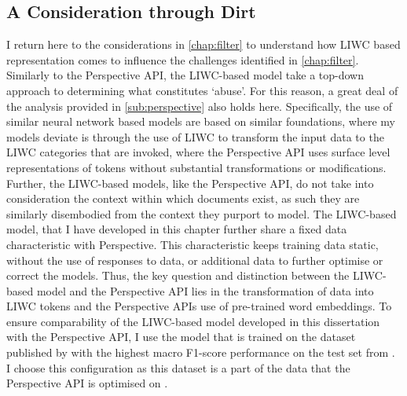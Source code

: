 
\subsection{A Consideration through Dirt}\label{sub:liwc_model}

I return here to the considerations in \cref{chap:filter} to understand how LIWC based representation comes to influence the challenges identified in \cref{chap:filter}.
Similarly to the Perspective API, the LIWC-based model take a top-down approach to determining what constitutes `abuse'. For this reason, a great deal of the analysis provided in \cref{sub:perspective} also holds here.
Specifically, the use of similar neural network based models are based on similar foundations, where my models deviate is through the use of LIWC \cite{Pennebaker:2001} to transform the input data to the LIWC categories that are invoked, where the Perspective API uses surface level representations of tokens without substantial transformations or modifications. 
Further, the LIWC-based models, like the Perspective API, do not take into consideration the context within which documents exist, as such they are similarly disembodied from the context they purport to model.
The LIWC-based model, that I have developed in this chapter further share a fixed data characteristic with Perspective.
This characteristic keeps training data static, without the use of responses to data, or additional data to further optimise or correct the models.
Thus, the key question and distinction between the LIWC-based model and the Perspective API lies in the transformation of data into LIWC tokens and the Perspective APIs use of pre-trained word embeddings.
To ensure comparability of the LIWC-based model developed in this dissertation with the Perspective API, I use the model that is trained on the dataset published by \citet{Wulczyn:2017} with the highest macro F1-score performance on the test set from \citet{Wulczyn:2017}.
I choose this configuration as this dataset is a part of the data that the Perspective API is optimised on \citep{Perspective:Github}.

